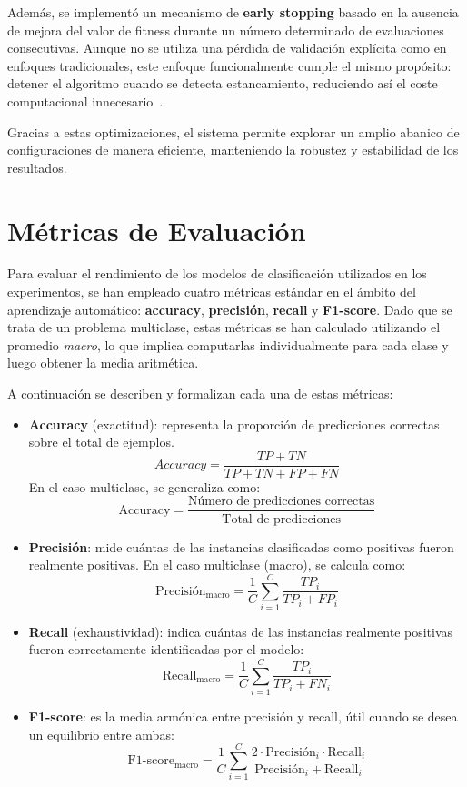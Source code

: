 Además, se implementó un mecanismo de \textbf{early stopping} basado en la ausencia de mejora del valor de fitness durante
un número determinado de evaluaciones consecutivas.
Aunque no se utiliza una pérdida de validación explícita como en enfoques tradicionales, este enfoque funcionalmente cumple el mismo propósito:
detener el algoritmo cuando se detecta estancamiento, reduciendo así el coste computacional innecesario~\cite{EarlyStoppingDiscussion2024}.


Gracias a estas optimizaciones, el sistema permite explorar un amplio abanico de configuraciones de manera eficiente, manteniendo la robustez y estabilidad de los resultados.

\section{Métricas de Evaluación}\label{sec:metricas-evaluacion}

Para evaluar el rendimiento de los modelos de clasificación utilizados en los experimentos,
se han empleado cuatro métricas estándar en el ámbito del aprendizaje automático: \textbf{accuracy}, \textbf{precisión}, \textbf{recall} y \textbf{F1-score}.
Dado que se trata de un problema multiclase, estas métricas se han calculado utilizando el promedio \textit{macro},
lo que implica computarlas individualmente para cada clase y luego obtener la media aritmética.

A continuación se describen y formalizan cada una de estas métricas:

\begin{itemize}
      \item \textbf{Accuracy} (exactitud): representa la proporción de predicciones correctas sobre el total de ejemplos.
            $$
                  Accuracy = \frac{TP + TN}{TP + TN + FP + FN}
            $$
            En el caso multiclase, se generaliza como:
            $$
                  \mathrm{Accuracy} = \frac{\text{Número de predicciones correctas}}{\text{Total de predicciones}}
            $$

      \item \textbf{Precisión}: mide cuántas de las instancias clasificadas como positivas fueron realmente positivas.
            En el caso multiclase (macro), se calcula como:
            $$
                  \text{Precisión}_{\text{macro}} = \frac{1}{C} \sum_{i=1}^{C} \frac{TP_i}{TP_i + FP_i}
            $$

      \item \textbf{Recall} (exhaustividad): indica cuántas de las instancias realmente positivas fueron correctamente identificadas por el modelo:
            $$
                  \mathrm{Recall}_{\text{macro}} = \frac{1}{C} \sum_{i=1}^{C} \frac{TP_i}{TP_i + FN_i}
            $$

      \item \textbf{F1-score}: es la media armónica entre precisión y recall, útil cuando se desea un equilibrio entre ambas:
            $$
                  \mathrm{F1\text{-}score}_{\text{macro}} = \frac{1}{C} \sum_{i=1}^{C} \frac{2 \cdot \text{Precisión}_i \cdot \text{Recall}_i}{\text{Precisión}_i + \text{Recall}_i}
            $$
\end{itemize}

